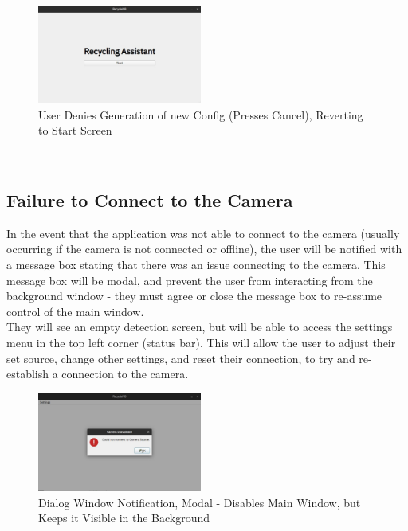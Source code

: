 \documentclass[conference]{IEEEtran}
\begin{document}
\begin{figure}[!h]
    \centering
    \includegraphics[width=0.48\textwidth]{images/start.eps}
    \caption{User Denies Generation of new Config (Presses Cancel), Reverting to Start Screen}
\end{figure}~\\

\newpage
\subsection{Failure to Connect to the Camera}
In the event that the application was not able to connect to the camera (usually occurring if the camera is not connected or offline), the user will be notified with a message box stating that there was an issue connecting to the camera. This message box will be modal, and prevent the user from interacting from the background window - they must agree or close the message box to re-assume control of the main window.~\\

They will see an empty detection screen, but will be able to access the settings menu in the top left corner (status bar). This will allow the user to adjust their set source, change other settings, and reset their connection, to try and re-establish a connection to the camera.~\\

\begin{figure}[h]
    \centering
    \includegraphics[width=0.48\textwidth]{images/camera_source_error.eps}
    \caption{Dialog Window Notification, Modal - Disables Main Window, but Keeps it Visible in the Background}
\end{figure}
\end{document}
